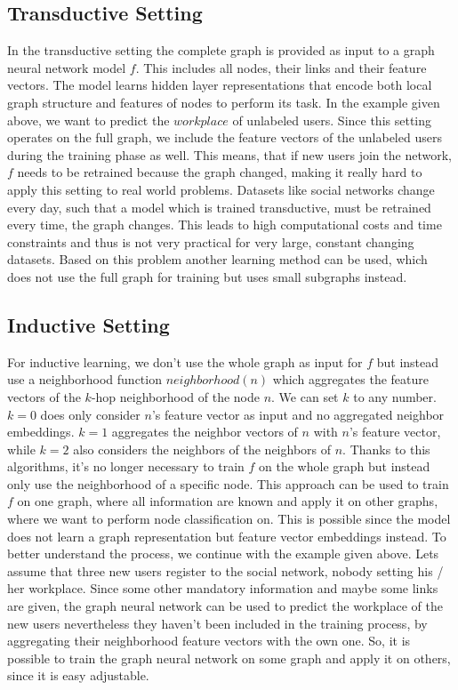     \subsection*{Transductive Setting}

      In the transductive setting \cite{kipf2017semisupervised} the complete graph is provided as input to a graph neural network model $f$.
      This includes all nodes, their links and their feature vectors.
      The model learns hidden layer representations that encode both local graph structure and features of nodes to perform its task.
      In the example given above, we want to predict the $workplace$ of unlabeled users.
      Since this setting operates on the full graph, we include the feature vectors of the unlabeled users during the training phase as well.
      This means, that if new users join the network, $f$ needs to be retrained because the graph changed, making it really hard to apply this setting to real world problems.
      Datasets like social networks change every day, such that a model which is trained transductive, must be retrained every time, the graph changes.
      This leads to high computational costs and time constraints and thus is not very practical for very large, constant changing datasets.
      Based on this problem another learning method can be used, which does not use the full graph for training but uses small subgraphs instead.

    \subsection*{Inductive Setting}

      For inductive learning, we don't use the whole graph as input for $f$ but instead use a neighborhood function $neighborhood(n)$ which aggregates the feature vectors of the $k$-hop neighborhood of the node $n$. 
      We can set $k$ to any number.
      $k = 0$ does only consider $n$'s feature vector as input and no aggregated neighbor embeddings.
      $k = 1$ aggregates the neighbor vectors of $n$ with $n$'s feature vector, while $k = 2$ also considers the neighbors of the neighbors of $n$.
      Thanks to this algorithms, it's no longer necessary to train $f$ on the whole graph but instead only use the neighborhood of a specific node.
      This approach can be used to train $f$ on one graph, where all information are known and apply it on other graphs, where we want to perform node classification on.
      This is possible since the model does not learn a graph representation but feature vector embeddings instead.
      To better understand the process, we continue with the example given above.
      Lets assume that three new users register to the social network, nobody setting his / her workplace.
      Since some other mandatory information and maybe some links are given, the graph neural network can be used to predict the workplace of the new users nevertheless they haven't been included in the training process, by aggregating their neighborhood feature vectors with the own one.
      So, it is possible to train the graph neural network on some graph and apply it on others, since it is easy adjustable.
        
